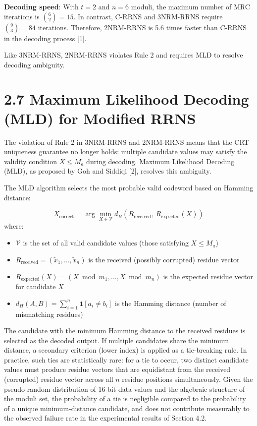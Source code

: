 \documentclass[
  english,
  12pt,
]{report}
\providecommand{\tightlist}{%
  \setlength{\itemsep}{0pt}\setlength{\parskip}{0pt}}
\begin{document}
\textbf{Decoding speed}: With \(t = 2\) and \(n = 6\) moduli, the
maximum number of MRC iterations is \(\binom{6}{2} = 15\). In contrast,
C-RRNS and 3NRM-RRNS require \(\binom{9}{3} = 84\) iterations.
Therefore, 2NRM-RRNS is 5.6 times faster than C-RRNS in the decoding
process {[}1{]}.

Like 3NRM-RRNS, 2NRM-RRNS violates Rule 2 and requires MLD to resolve
decoding ambiguity.

\section{2.7 Maximum Likelihood Decoding (MLD) for Modified
RRNS}\label{maximum-likelihood-decoding-mld-for-modified-rrns}

The violation of Rule 2 in 3NRM-RRNS and 2NRM-RRNS means that the CRT
uniqueness guarantee no longer holds: multiple candidate values may
satisfy the validity condition \(X \leq M_a\) during decoding. Maximum
Likelihood Decoding (MLD), as proposed by Goh and Siddiqi {[}2{]},
resolves this ambiguity.

The MLD algorithm selects the most probable valid codeword based on
Hamming distance:

\[X_{\text{correct}} = \arg\min_{X \in \mathcal{V}} d_H\!\left(R_{\text{received}},\ R_{\text{expected}}(X)\right)\]
where:

\begin{itemize}
\tightlist
\item
  \(\mathcal{V}\) is the set of all valid candidate values (those
  satisfying \(X \leq M_a\))
\item
  \(R_{\text{received}} = (\tilde{x}_1, \ldots, \tilde{x}_n)\) is the
  received (possibly corrupted) residue vector
\item
  \(R_{\text{expected}}(X) = (X \bmod m_1, \ldots, X \bmod m_n)\) is the
  expected residue vector for candidate \(X\)
\item
  \(d_H(A, B) = \sum_{i=1}^{n} \mathbf{1}[a_i \neq b_i]\) is the Hamming
  distance (number of mismatching residues)
\end{itemize}

The candidate with the minimum Hamming distance to the received residues
is selected as the decoded output. If multiple candidates share the
minimum distance, a secondary criterion (lower index) is applied as a
tie-breaking rule. In practice, such ties are statistically rare: for a
tie to occur, two distinct candidate values must produce residue vectors
that are equidistant from the received (corrupted) residue vector across
all \(n\) residue positions simultaneously. Given the pseudo-random
distribution of 16-bit data values and the algebraic structure of the
moduli set, the probability of a tie is negligible compared to the
probability of a unique minimum-distance candidate, and does not
contribute measurably to the observed failure rate in the experimental
results of Section 4.2.
\end{document}
